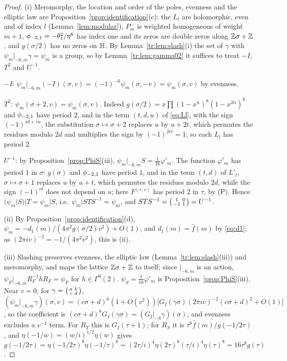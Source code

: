 \begin{proof}
(i) Meromorphy, the location and order of the poles, evenness and the elliptic law are Proposition~\ref{prop:identification}(c): the $L_l$ are holomorphic, even and of index $l$ (Lemma~\ref{lem:modular}), $P_m$ is weighted homogeneous of weight $m+1$, $\phi_{-2,1}=-\theta_1^2/\eta^6$ has index one and its zeros are double zeros along $\mathbb{Z}\sigma+\mathbb{Z}$, and $g(\sigma/2)$ has no zeros on $\mathbb{H}$. By Lemma~\ref{tr:lem:slash}(i) the set of $\gamma$ with $\psi_m|_{-6,m}\gamma=\psi_m$ is a group, so by Lemma~\ref{tr:lem:gamma02} it suffices to treat $-I$, $T^2$ and $U^{-1}$.

$-I$: $\psi_m|_{-6,m}(-I)(\sigma,v)=(-1)^{-6}\psi_m(\sigma,-v)=\psi_m(\sigma,v)$ by evenness.

$T^2$: $\psi_m(\sigma+2,v)=\psi_m(\sigma,v)$. Indeed $g(\sigma/2)=x\prod(1-x^n)^8(1-x^{2n})^8$ and $\phi_{-2,1}$ have period $2$, and in the term $(t,d,u)$ of \eqref{eq:Ll}, with the sign $(-1)^{sd+ru}$, the substitution $\sigma\mapsto\sigma+2$ replaces $u$ by $u+2t$, which permutes the residues modulo $2d$ and multiplies the sign by $(-1)^{2rt}=1$; so each $L_l$ has period $2$.

$U^{-1}$: by Proposition~\ref{prop:PhiS}(iii), $\psi_m|_{-6,m}S=\frac1{16}\varphi'_m$. The function $\varphi'_m$ has period $1$ in $\sigma$: $g(\sigma)$ and $\phi_{-2,1}$ have period $1$, and in the term $(t,d)$ of $L'_l$, $\sigma\mapsto\sigma+1$ replaces $u$ by $u+t$, which permutes the residues modulo $2d$, while the sign $(-1)^{rt}$ does not depend on $u$; here $F^{(r,s)}$ has period $2$ in $\tau$, by (P). Hence $(\psi_m|S)|T=\psi_m|S$, i.e.\ $\psi_m|STS^{-1}=\psi_m$, and $STS^{-1}=\begin{psmallmatrix}1&0\\-1&1\end{psmallmatrix}=U^{-1}$.

(ii) By Proposition~\ref{prop:identification}(d), $\psi_m=-d_1(m)/(4\pi^2g(\sigma/2)v^2)+O(1)$, and $d_1(m)=\hat f(m)$ by \eqref{eq:d1}; as $(2\pi iv)^{-2}=-1/(4\pi^2v^2)$, this is (ii).

(iii) Slashing preserves evenness, the elliptic law (Lemma~\ref{tr:lem:slash}(iii)) and meromorphy, and maps the lattice $\mathbb{Z}\sigma+\mathbb{Z}$ to itself; since $|_{-6,m}$ is an action, $\psi_F|_{-6,m}R_F^{-1}hR_F=\psi_F$ for $h\in\Gamma^0(2)$. $\psi_S=\frac1{16}\varphi'_m$ is Proposition~\ref{prop:PhiS}(iii). Near $v=0$, for $\gamma=\begin{psmallmatrix}a&b\\c&d\end{psmallmatrix}$, $(\psi_m|_{-6,m}\gamma)(\sigma,v)=(c\sigma+d)^6(1+O(v^2))\big[G_I(\gamma\sigma)(2\pi iv)^{-2}(c\sigma+d)^2+O(1)\big]$, so the coefficient is $(c\sigma+d)^8G_I(\gamma\sigma)=(G_I|_{-8}\gamma)(\sigma)$, and evenness excludes a $v^{-1}$ term. For $R_T$ this is $G_I(\tau+1)$; for $R_S$ it is $\tau^8\hat f(m)/g(-1/2\tau)$, and $\eta(-1/w)=(w/i)^{1/2}\eta(w)$ gives $g(-1/2\tau)=\eta(-1/2\tau)^8\eta(-1/\tau)^8=(2\tau/i)^4\eta(2\tau)^8(\tau/i)^4\eta(\tau)^8=16\tau^8g(\tau)$.


\end{proof}
